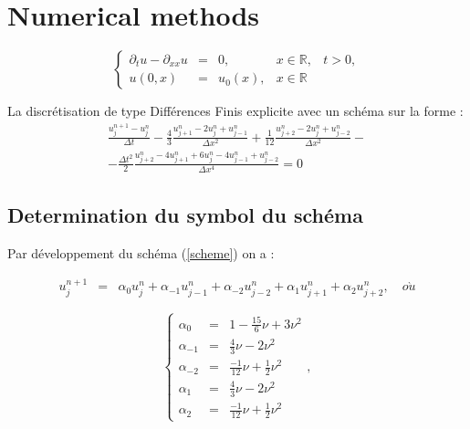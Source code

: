 \documentclass[a4paper,11pt]{article}
\begin{document}
\section{Numerical methods}

\begin{equation}
    \left\{
    \begin{array}{rclll}
        \partial_{t}u - \partial_{xx}u &=& 0, &x \in \mathbb{R}, & t>0, \\
        u(0, x) &=& u_{0}(x), &x \in \mathbb{R} &
    \end{array}
    \right.
\end{equation}

La discrétisation de type Différences Finis explicite avec un schéma sur la forme :
\begin{equation} \label{scheme}
    \begin{split} 
        \frac{u^{n+1}_{j} - u^{n}_{j}}{\Delta t}
        -\frac{4}{3} \frac{u^{n}_{j+1} - 2u^{n}_{j} + u^{n}_{j-1}}{\Delta x^{2}}
        +\frac{1}{12} \frac{u^{n}_{j+2} - 2u^{n}_{j} + u^{n}_{j-2}}{\Delta x^{2}} - \\
        -\frac{\Delta t^{2}}{2} \frac{u^{n}_{j+2} - 4u^{n}_{j+1} + 6u^{n}_{j}  - 4u^{n}_{j-1} + u^{n}_{j-2}}{\Delta x^{4}}  = 0 
    \end{split}
\end{equation}


\subsection{Determination du symbol du schéma}

Par développement du schéma (\ref{scheme}) on a :

\begin{equation*}
    \begin{array}{rcl}
        u^{n+1}_{j} &=& \alpha_{0} u^{n}_{j} + \alpha_{-1} u^{n}_{j-1} + \alpha_{-2} u^{n}_{j-2} + \alpha_{1} u^{n}_{j+1} + \alpha_{2} u^{n}_{j+2}, \quad o\grave{u}
    \end{array}
\end{equation*}

\begin{equation*}
    \left\{
    \begin{array}{rcl}
        \alpha_{0} &=& 1 - \scriptstyle \frac{15}{6} \nu + 3 \nu^{2} \\
        \alpha_{-1} &=& \scriptstyle \frac{4}{3} \nu - 2 \nu^{2} \\
        \alpha_{-2} &=& \scriptstyle \frac{-1}{12} \nu + \frac{1}{2} \nu^{2} \\
        \alpha_{1} &=& \scriptstyle \frac{4}{3} \nu - 2 \nu^{2} \\
        \alpha_{2} &=& \scriptstyle \frac{-1}{12} \nu + \frac{1}{2} \nu^{2}
    \end{array}
    \right.,
\end{equation*}
\end{document}
